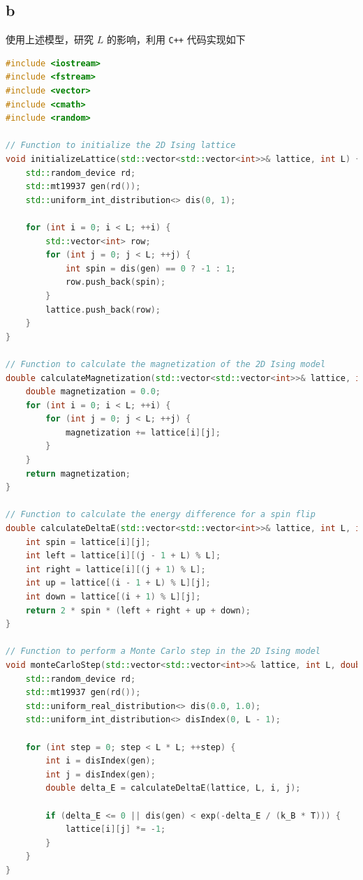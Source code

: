 \documentclass[UTF8]{ctexart}
\begin{document}
    \subsection{b}\label{subsec:4.2}
    使用上述模型，研究 \(L\) 的影响，利用 \texttt{C++} 代码实现如下
    \begin{lstlisting}[language=C++, breaklines = true,label={lst:4.2}]
#include <iostream>
#include <fstream>
#include <vector>
#include <cmath>
#include <random>

// Function to initialize the 2D Ising lattice
void initializeLattice(std::vector<std::vector<int>>& lattice, int L) {
    std::random_device rd;
    std::mt19937 gen(rd());
    std::uniform_int_distribution<> dis(0, 1);

    for (int i = 0; i < L; ++i) {
        std::vector<int> row;
        for (int j = 0; j < L; ++j) {
            int spin = dis(gen) == 0 ? -1 : 1;
            row.push_back(spin);
        }
        lattice.push_back(row);
    }
}

// Function to calculate the magnetization of the 2D Ising model
double calculateMagnetization(std::vector<std::vector<int>>& lattice, int L) {
    double magnetization = 0.0;
    for (int i = 0; i < L; ++i) {
        for (int j = 0; j < L; ++j) {
            magnetization += lattice[i][j];
        }
    }
    return magnetization;
}

// Function to calculate the energy difference for a spin flip
double calculateDeltaE(std::vector<std::vector<int>>& lattice, int L, int i, int j) {
    int spin = lattice[i][j];
    int left = lattice[i][(j - 1 + L) % L];
    int right = lattice[i][(j + 1) % L];
    int up = lattice[(i - 1 + L) % L][j];
    int down = lattice[(i + 1) % L][j];
    return 2 * spin * (left + right + up + down);
}

// Function to perform a Monte Carlo step in the 2D Ising model
void monteCarloStep(std::vector<std::vector<int>>& lattice, int L, double J, double k_B, double T) {
    std::random_device rd;
    std::mt19937 gen(rd());
    std::uniform_real_distribution<> dis(0.0, 1.0);
    std::uniform_int_distribution<> disIndex(0, L - 1);

    for (int step = 0; step < L * L; ++step) {
        int i = disIndex(gen);
        int j = disIndex(gen);
        double delta_E = calculateDeltaE(lattice, L, i, j);

        if (delta_E <= 0 || dis(gen) < exp(-delta_E / (k_B * T))) {
            lattice[i][j] *= -1;
        }
    }
}


\end{lstlisting}
\end{document}
